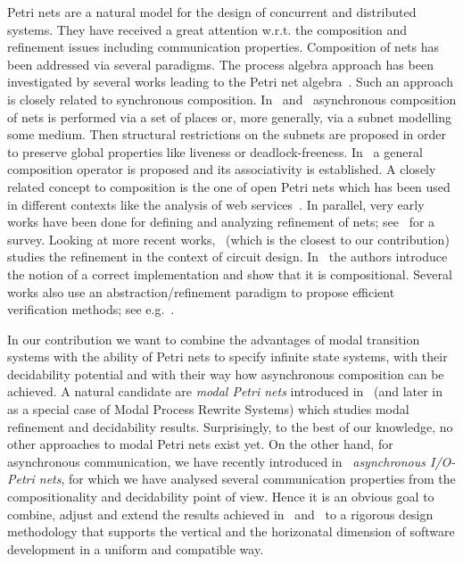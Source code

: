 Petri nets are a natural model for the design of concurrent and distributed systems.
They have received a great attention w.r.t. the composition and refinement
issues including communication properties. Composition of nets has been addressed via several paradigms.
The process algebra approach
has been investigated by several works leading to the Petri net
algebra~\cite{BDK01}. Such an approach is closely related to synchronous composition.
In~\cite{Souissi90} and~\cite{SM89} asynchronous composition of nets is performed
via a set of places or, more generally, via a subnet modelling some medium. Then
structural restrictions on the subnets are proposed in order to preserve
global properties like liveness or deadlock-freeness.
In~\cite{reisig09} a general composition operator is proposed and
its associativity is established. A closely related concept to composition
is the one of open Petri nets which has been used in different contexts
like the analysis of web services~\cite{DK2009}.
In parallel, very early works
have been done for defining and analyzing refinement of nets;
see~\cite{brauer89} for a survey. Looking at more recent works,~\cite{schafer07} (which is the closest to our contribution)
studies the refinement in the context of circuit design.
In~\cite{schafer07} the authors introduce the notion of a correct implementation
and show that it is compositional. Several works
also use an abstraction/refinement paradigm to propose efficient verification
methods; see e.g.~\cite{ganty07}.

In our contribution we want to combine the advantages of modal transition systems
with the ability of Petri nets to specify infinite state systems,
with their decidability potential and with their way how asynchronous composition
can be achieved.  A natural candidate are \emph{modal Petri nets} introduced in~\cite{EHH12} (and later in \cite{BK12} as a special case of Modal Process Rewrite Systems)
which studies modal refinement and decidability results.
Surprisingly, to the best of our knowledge, no other approaches to modal Petri nets exist yet.
On the other hand, for asynchronous communication, we have recently
introduced in~\cite{haddad-et-al-2013} \emph{asynchronous I/O-Petri nets},
for which we have analysed several communication properties from the compositionality
and decidability point of view.
Hence it is an obvious goal to combine, adjust and extend the results achieved in~\cite{EHH12}
and~\cite{haddad-et-al-2013} to a rigorous design methodology that
supports the vertical and the horizonatal dimension of software development
in a uniform and compatible way.

